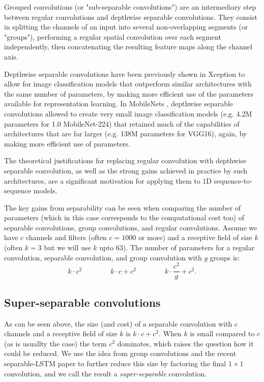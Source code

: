 \documentclass{article}
\begin{document}
Grouped convolutions (or "sub-separable convolutions") are an intermediary step between regular convolutions and depthwise separable convolutions. They consist in splitting the channels of an input into several non-overlapping segments (or "groups"), performing a regular spatial convolution over each segment independently, then concatenating the resulting feature maps along the channel axis.

Depthwise separable convolutions have been previously shown in Xception \citep{xception2016} to allow for image classification models that outperform similar architectures with the same number of parameters, by making more efficient use of the parameters available for representation learning. In MobileNets \citep{mobilenets2017}, depthwise separable convolutions allowed to create very small image classification models (e.g. 4.2M parameters for 1.0 MobileNet-224) that retained much of the capabilities of architectures that are far larger (e.g. 138M parameters for VGG16), again, by making more efficient use of parameters.

The theoretical justifications for replacing regular convolution with depthwise separable convolution, as well as the strong gains achieved in practice by such architectures, are a significant motivation for applying them to 1D sequence-to-sequence models.

The key gains from separability can be seen when comparing the number of parameters (which in this case corresponds to the computational cost too) of separable convolutions, group convolutions, and regular convolutions. Assume we have $c$ channels and filters (often $c=1000$ or more) and a receptive field of size $k$ (often $k=3$ but we will use $k$ upto $63$). The number of parameters for a regular convolution, separable convolution, and group convolution with $g$ groups is:
\[ k \cdot c^2 \qquad \qquad k\cdot c + c^2 \qquad \qquad k \cdot \frac{c^2}{g} + c^2. \]

\subsection{Super-separable convolutions}

As can be seen above, the size (and cost) of a separable convolution with $c$ channels and a receptive field of size $k$ is $k\cdot c + c^2$.
When $k$ is small compared to $c$ (as is usuallty the case) the term $c^2$ dominates, which raises the question how it could be reduced.
We use the idea from group convolutions and the recent separable-LSTM paper \cite{factlstm} to further reduce this size by factoring the final $1 \times 1$ convolution, and we call the result a \emph{super-separable} convolution.
\end{document}
